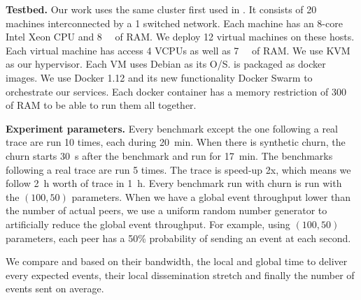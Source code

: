 \par
\textbf{Testbed.}  Our work uses the same cluster first used in \autocite{vaucher2016erasure}. It consists of 20 machines interconnected by a \SI{1}{\gbps} switched network. Each machine has an 8-core Intel Xeon CPU and \SI{8}{\giga\byte} of RAM. We deploy 12 virtual machines on these hosts. Each virtual machine has access 4 VCPUs as well as \SI{7}{\giga\byte} of RAM. We use KVM as our hypervisor. Each VM uses Debian as its O/S. \eptotester is packaged as docker images. We use Docker 1.12 and its new functionality Docker Swarm to orchestrate our services. Each docker container has a memory restriction of \SI{300}{\mega\byte} of RAM to be able to run them all together.
\par
\textbf{Experiment parameters.} Every benchmark except the one following a real trace are run 10 times, each during \SI{20}{\minute}. When there is synthetic churn, the churn starts \SI{30}{\second} after the benchmark and run for \SI{17}{\minute}. The benchmarks following a real trace are run 5 times. The trace is speed-up 2x, which means we follow \SI{2}{\hour} worth of trace in \SI{1}{\hour}. Every benchmark run with churn is run with the $(100,50)$ parameters. When we have a global event throughput lower than the number of actual peers, we use a uniform random number generator to artificially reduce the global event throughput. For example, using $(100,50)$ parameters, each peer has a 50\% probability of sending an event at each second.
\par
We compare \epto and \jgroups based on their bandwidth, the local and global time to deliver every expected events, their local dissemination stretch and finally the number of events sent on average.
